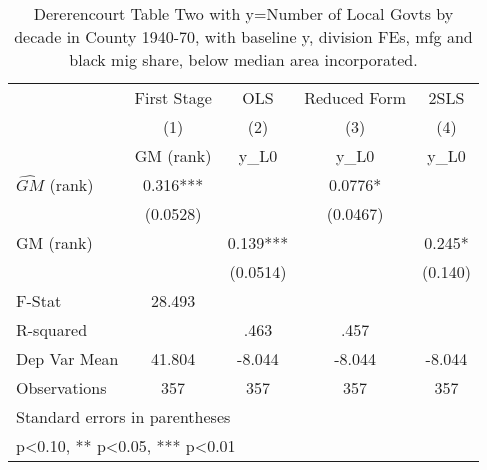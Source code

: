 \begin{table}[htbp]\centering
\def\sym#1{\ifmmode^{#1}\else\(^{#1}\)\fi}
\caption{Dererencourt Table Two with y=Number of Local Govts by decade in County 1940-70, with baseline y, division FEs, mfg and black mig share, below median area incorporated.}
\begin{tabular}{l*{4}{c}}
\toprule
                    & First Stage   &         OLS   &Reduced Form   &        2SLS   \\
                    &\multicolumn{1}{c}{(1)}&\multicolumn{1}{c}{(2)}&\multicolumn{1}{c}{(3)}&\multicolumn{1}{c}{(4)}\\
                    &\multicolumn{1}{c}{GM  (rank)}&\multicolumn{1}{c}{y\_L0}&\multicolumn{1}{c}{y\_L0}&\multicolumn{1}{c}{y\_L0}\\
\midrule
$\hat{GM}$ (rank)   &       0.316***&               &      0.0776*  &               \\
                    &    (0.0528)   &               &    (0.0467)   &               \\
\addlinespace
GM  (rank)          &               &       0.139***&               &       0.245*  \\
                    &               &    (0.0514)   &               &     (0.140)   \\
\midrule
F-Stat              &      28.493   &               &               &               \\
R-squared           &               &        .463   &        .457   &               \\
Dep Var Mean        &      41.804   &      -8.044   &      -8.044   &      -8.044   \\
Observations        &         357   &         357   &         357   &         357   \\
\bottomrule
\multicolumn{5}{l}{\footnotesize Standard errors in parentheses}\\
\multicolumn{5}{l}{\footnotesize * p<0.10, ** p<0.05, *** p<0.01}\\
\end{tabular}
\end{table}
